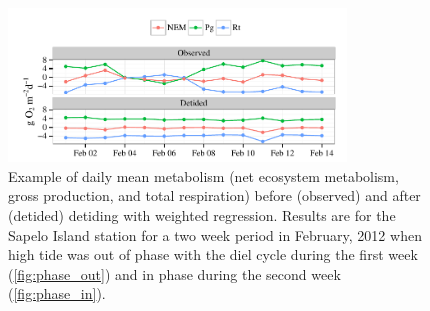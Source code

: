 \documentclass[letterpaper,12pt,oneside]{article}\usepackage[]{graphicx}\usepackage[]{color}
\newenvironment{knitrout}{}{} %
\begin{document}
\centering\vspace*{\fill}
\begin{knitrout}
\color{fgcolor}\begin{figure}[!ht]


{\centering \includegraphics[width=0.8\textwidth]{figure/case_ex} 

}

\caption[Example of daily mean metabolism (net ecosystem metabolism, gross production, and total respiration) before (observed) and after (detided) detiding with weighted regression]{Example of daily mean metabolism (net ecosystem metabolism, gross production, and total respiration) before (observed) and after (detided) detiding with weighted regression. Results are for the Sapelo Island station for a two week period in February, 2012 when high tide was out of phase with the diel cycle during the first week (\cref{fig:phase_out}) and in phase during the second week (\cref{fig:phase_in}).\label{fig:case_ex}}
\end{figure}


\end{knitrout}
\end{document}
